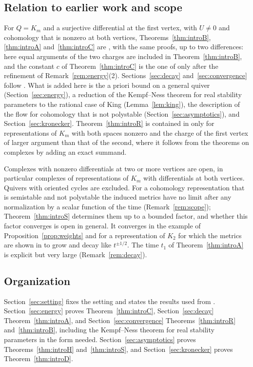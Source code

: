 \subsection{Relation to earlier work and scope}
For $Q=K_m$ and a surjective differential at the first vertex, with $U\neq0$
and cohomology that is nonzero at both vertices,
Theorems~\ref{thm:introB}, \ref{thm:introA} and~\ref{thm:introC} are
\cite[Theorems~5.4, 5.7, 6.1 and~6.6]{wue26b}, with the same proofs, up to
two differences: here equal arguments of the two charges are included in
Theorem~\ref{thm:introB}, and the constant $c$ of
Theorem~\ref{thm:introC} is the one of \cite{wue26b} only after the
refinement of Remark~\ref{rem:energy}(2). Sections~\ref{sec:decay}
and~\ref{sec:convergence} follow \cite{wue26b}. What is added here is the
a priori bound on a general quiver (Section~\ref{sec:energy}), a reduction of
the Kempf--Ness theorem for real stability parameters to the rational case
of King (Lemma~\ref{lem:king}), the description of the flow for cohomology
that is not polystable (Section~\ref{sec:asymptotics}), and
Section~\ref{sec:kronecker}.
Theorem~\ref{thm:introR} is contained in \cite{wue26b} only for
representations of $K_m$ with both spaces nonzero and the charge of the
first vertex of larger argument than that of the second, where it follows
from the theorems on complexes by adding an exact summand.

Complexes with nonzero differentials at two or more vertices are open, in
particular complexes of representations of $K_m$ with differentials at both
vertices. Quivers with oriented cycles are excluded. For a cohomology
representation that is semistable and not polystable the induced metrics
have no limit after any normalization by a scalar function of the time
(Remark~\ref{rem:scope}); Theorem~\ref{thm:introS} determines them up to a
bounded factor, and whether this factor converges is open in general. It
converges in the example of Proposition~\ref{prop:weights} and for a
representation of $K_2$ for which the metrics are shown in
\cite[Proposition~6.9]{wue26b} to grow and decay like $t^{\pm1/2}$. The time $t_1$ of Theorem~\ref{thm:introA} is explicit
but very large (Remark~\ref{rem:decay}).

\subsection{Organization}
Section~\ref{sec:setting} fixes the setting and states the results used from
\cite{wue26a,wue26b,wue26c}. Section~\ref{sec:energy} proves
Theorem~\ref{thm:introC}, Section~\ref{sec:decay} Theorem~\ref{thm:introA},
and Section~\ref{sec:convergence} Theorems~\ref{thm:introR}
and~\ref{thm:introB}, including the Kempf--Ness theorem for real stability
parameters in the form needed. Section~\ref{sec:asymptotics} proves
Theorems~\ref{thm:introH} and~\ref{thm:introS}, and
Section~\ref{sec:kronecker} proves Theorem~\ref{thm:introD}.
